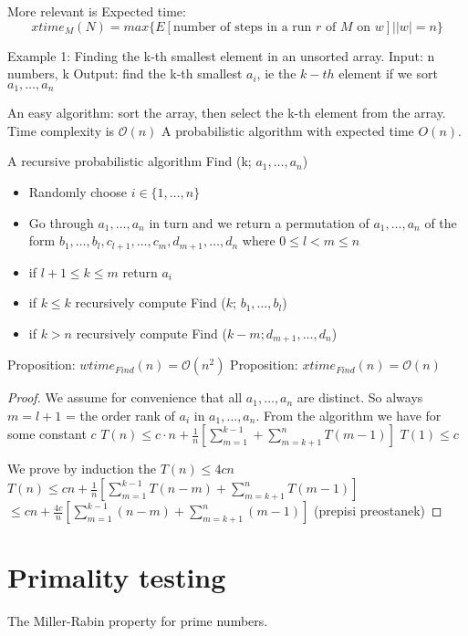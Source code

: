 \documentclass[a4paper,12pt]{article}
\theoremstyle{definition}
\theoremstyle{remark}
\begin{document}
More relevant is Expected time:
\begin{equation*}
    xtime_M(N) = max \{E[\text{number of steps in a run } r \text{ of } M \text{ on } w]| |w| = n\}
\end{equation*}

Example 1: Finding the k-th smallest element in an unsorted array.
Input: n numbers, k
Output: find the k-th smallest $a_i$, ie the $k-th$ element if we sort $a_1, \dots, a_n$

An easy algorithm: sort the array, then select the k-th element from the array. Time complexity is $\mathscr{O}(n)$
A probabilistic algorithm with expected time $O(n)$.

A recursive probabilistic algorithm Find (k; $a_1, \dots, a_n$)
\begin{itemize}
    \item Randomly choose $i \in \{1, \dots, n\}$
    \item Go through $a_1, \dots, a_n$ in turn and we return a permutation of $a_1, \dots, a_n$ of the form 
    $b_1, \dots, b_l, c_{l+1}, \dots, c_m, d_{m+1}, \dots, d_n$ where $0 \leq l < m \leq n$
    \item if $l + 1 \leq k \leq m$ return $a_i$
    \item if $k \leq k$ recursively compute Find ($k$; $b_1, \dots, b_l$)
    \item if $k > n$ recursively compute Find ($k-m; d_{m+1}, \dots, d_n$) 
\end{itemize}

Proposition: $wtime_{Find}(n) = \mathscr{O}(n^2)$
Proposition: $xtime_{Find}(n) = \mathscr{O}(n)$

\begin{proof}
    We assume for convenience that all $a_1, \dots, a_n$ are distinct.
    So always $m = l + 1$ = the order rank of $a_i$ in $a_1, \dots, a_n$.
    From the algorithm we have for some constant $c$
    $T(n) \leq c \cdot n + \frac{1}{n}[\sum_{m = 1}^{k-1} + \sum_{m = k + 1}^{n} T(m-1)]$
    $T(1) \leq c$

    We prove by induction the $T(n) \leq 4 c n$
    $T(n) \leq cn + \frac{1}{n} [\sum_{m=1}^{k-1} T(n-m) + \sum_{m = k + 1}^{n} T(m-1)]$
    $ \leq cn + \frac{4c}{n} [\sum_{m=1}^{k-1} (n-m) + \sum_{m = k + 1}^{n} (m-1)]$
    (prepisi preostanek)
\end{proof}


\section{Primality testing}
The Miller-Rabin property for prime numbers.
\end{document}
